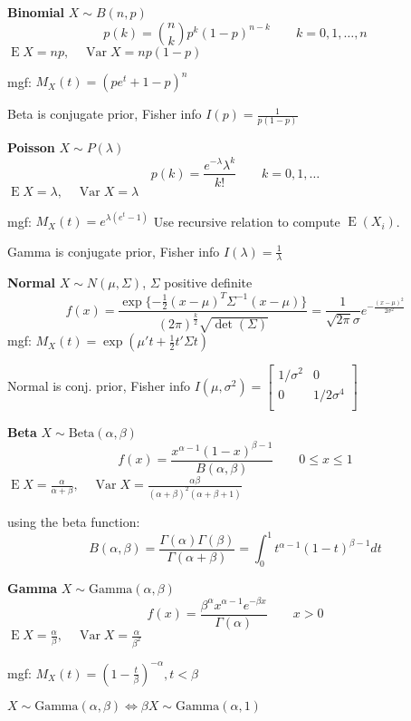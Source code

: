 \documentclass[10pt, twocolumn]{article}
\newcommand{\Expect}{\operatorname{E}}
\newcommand{\Var}{\operatorname{Var}}
\begin{document}
\newpage

\textbf{Binomial}
$X \sim B(n, p)$
\[
    p(k) = \binom{n}{k} p^k (1-p)^{n-k}
    \qquad k = 0, 1, \dots, n
\]
$\Expect X = np, \quad \Var X = np(1-p)$

mgf: $M_X (t) = (pe^t + 1 - p)^n$

Beta is conjugate prior, Fisher info $I(p) = \frac{1}{p(1 - p)}$

\textbf{Poisson}
$X \sim P(\lambda)$
\[
    p(k) = \frac{e^{-\lambda} \lambda^k}{k!}
    \qquad k = 0, 1, \dots
\]
$\Expect X = \lambda, \quad \Var X = \lambda$

mgf: $M_X (t) = e^{\lambda (e^t -1)}$ Use recursive relation to compute
$\Expect(X_i)$.

Gamma is conjugate prior, Fisher info $I(\lambda) = \frac{1}{\lambda}$

\textbf{Normal}
$X \sim N(\mu, \Sigma)$, $\Sigma$ positive definite
\[
    f(x) = \frac{\exp\{ - \frac{1}{2}(x - \mu)^T \Sigma^{-1} (x - \mu) \}}
        {(2\pi)^{\frac{k}{2}} \sqrt{\det(\Sigma)}}
        = \frac{1}{\sqrt{2 \pi} \sigma} e^{-\frac{(x - \mu)^2}{2
        \sigma^2}}
\]
mgf: $M_X (t) = \exp (\mu' t + \frac{1}{2} t' \Sigma t)$

Normal is conj. prior, Fisher info $I(\mu, \sigma^2) = 
[\begin{smallmatrix}
        1 / \sigma^2 & 0 \\
        0 & 1 / 2\sigma^4 \\
\end{smallmatrix}]$

\textbf{Beta}
$ X \sim \text{Beta}(\alpha, \beta)$
\[
    f(x) = \frac{x^{\alpha-1}(1 - x)^{\beta-1}}{B(\alpha, \beta)} 
    \qquad 0 \leq x \leq 1
\]
$\Expect X = \frac{\alpha}{\alpha + \beta},
\quad \Var X = \frac{\alpha \beta}{(\alpha + \beta)^2 (\alpha + \beta + 1)}$

using the beta function:
\[
    B(\alpha, \beta) =
    \frac{\Gamma(\alpha) \Gamma(\beta)}{\Gamma(\alpha+ \beta)} =
    \int_0^1 t^{\alpha -1} (1-t)^{\beta - 1}dt
\]

\textbf{Gamma}
$X \sim \text{Gamma}(\alpha, \beta)$
\[
    f(x) = \frac{\beta^\alpha x^{\alpha-1} e^{-\beta x}}{\Gamma(\alpha)}
    \qquad x > 0
\]
$\Expect X = \frac{\alpha}{\beta},
\quad \Var X = \frac{\alpha}{\beta^2}$

mgf: $M_X (t) = (1 - \frac{t}{\beta})^{-\alpha}, t < \beta$

$X \sim \text{Gamma}(\alpha, \beta) \iff \beta X \sim \text{Gamma}(\alpha, 1)$
\end{document}
